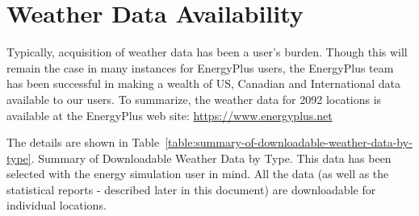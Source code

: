\section{Weather Data Availability}\label{weather-data-availability}

Typically, acquisition of weather data has been a user's burden. Though this will remain the case in many instances for EnergyPlus users, the EnergyPlus team has been successful in making a wealth of US, Canadian and International data available to our users. To summarize, the weather data for 2092 locations is available at the EnergyPlus web site: \href{https://www.energyplus.net/weather}{https://www.energyplus.net}

The details are shown in Table~\ref{table:summary-of-downloadable-weather-data-by-type}. Summary of Downloadable Weather Data by Type. This data has been selected with the energy simulation user in mind. All the data (as well as the statistical reports - described later in this document) are downloadable for individual locations.

